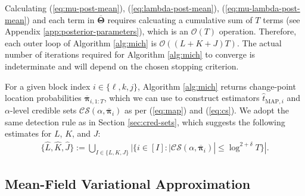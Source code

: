 \begin{remark} \label{rmk:computational-complexity}
    Calculating (\ref{eq:mu-post-mean}), (\ref{eq:lambda-post-mean}), (\ref{eq:mu-lambda-post-mean}) and each term in $\overline{\boldsymbol{\Theta}}$ requires calcuating a cumulative sum of $T$ terms (see Appendix \ref{app:posterior-parameters}), which is an $\mathcal{O}(T)$ operation. Therefore, each outer loop of Algorithm \ref{alg:mich} is $\mathcal{O}((L+K+J)T)$. The actual number of iterations required for Algorithm \ref{alg:mich} to converge is indeterminate and will depend on the chosen stopping criterion. 
\end{remark}
\vspace{-10pt}

For a given block index $i \in \{\ell, k, j\}$, Algorithm \ref{alg:mich} returns change-point location probabilities $\overline{\boldsymbol{\pi}}_{i,1:T}$, which we can use to construct estimators $\hat{t}_{\text{MAP}, i}$ and $\alpha$-level credible sets $\mathcal{CS}(\alpha, \overline{\boldsymbol{\pi}}_i)$ as per (\ref{eq:map}) and (\ref{eq:cs}). We adopt the same detection rule as in Section \ref{sec:cred-sets}, which suggests the following estimates for $L$, $K$, and $J$: 
\begin{align}
    \{\hat{L},\hat{K},\hat{J}\}  := \bigcup_{I \in \{L,K,J\}}|\{ i \in [I] : |\mathcal{CS}(\alpha, \overline{\boldsymbol{\pi}}_i)| \leq \log^{2+\delta} T\}|. \label{eq:LKJ-estimator}
\end{align}

\subsection{Mean-Field Variational Approximation}
\label{sec:variational-bayes}

